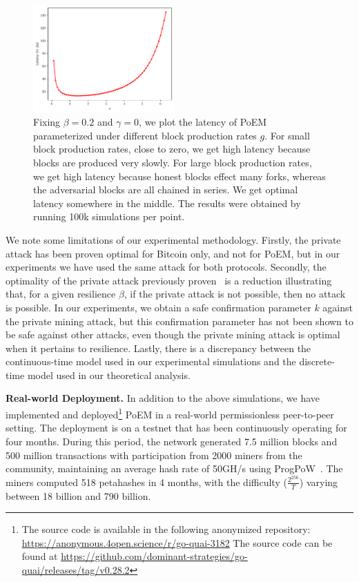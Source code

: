 \begin{figure}[pt]
    \centering
    \includegraphics[width = 0.48\textwidth]{figures/g_latency.pdf}

  \caption{Fixing $\beta=0.2$ and $\gamma=0$, we plot the latency of PoEM parameterized under different block production rates $g$.
          For small block production rates, close to zero, we get high latency because blocks are produced very slowly.
          For large block production rates, we get high latency because honest blocks effect many forks, whereas the adversarial blocks
          are all chained in series. We get optimal latency somewhere in the middle.
          The results were obtained by running 100k simulations per point.}
    \label{fig:g_latency}
\end{figure}

We note some limitations of our experimental methodology. Firstly, the private attack has been proven optimal
for Bitcoin only, and not for PoEM, but in our experiments we have used the same attack for both protocols.
Secondly, the optimality of the private attack previously proven~\cite{eiar} is a reduction illustrating
that, for a given resilience $\beta$, if the private attack is not possible, then no attack is possible.
In our experiments, we obtain a safe confirmation parameter $k$ against the private mining attack,
but this confirmation parameter has not been shown to be safe against other attacks, even though the private
mining attack is optimal when it pertains to resilience.
Lastly, there is a discrepancy between the continuous-time model used in our experimental simulations
and the discrete-time model used in our theoretical analysis.

\noindent
\textbf{Real-world Deployment.}
In addition to the above simulations,
we have implemented and deployed\footnote{
    \ifanonymous
        The source code is available in the following anonymized repository:
        \url{https://anonymous.4open.science/r/go-quai-3182}
    \else
        The source code can be found at
        \url{https://github.com/dominant-strategies/go-quai/releases/tag/v0.28.2}
    \fi
} PoEM in a real-world permissionless peer-to-peer
setting.
The deployment is on a testnet that has been continuously operating for
four months. During this period, the network generated 7.5 million blocks
and 500 million transactions
with participation from 2000 miners from the community, maintaining an
average hash rate of 50GH/s using ProgPoW~\cite{progpow}.
The miners computed 518 petahashes in 4 months,
with the difficulty ($\frac{2^{256}}{T}$)
varying between 18 billion and 790 billion.
